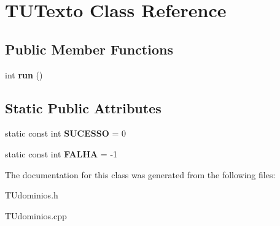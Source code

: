 \hypertarget{classTUTexto}{}\section{T\+U\+Texto Class Reference}
\label{classTUTexto}
\subsection*{Public Member Functions}
\begin{DoxyCompactItemize}
\item 
\mbox{\label{classTUTexto_afd0ced06861f0e336ef7248f36b31e2c}} 
int {\bfseries run} ()
\end{DoxyCompactItemize}
\subsection*{Static Public Attributes}
\begin{DoxyCompactItemize}
\item 
\mbox{\label{classTUTexto_a85843f1840647cc1c8dc2606fe03dc36}} 
static const int {\bfseries S\+U\+C\+E\+S\+SO} = 0
\item 
\mbox{\label{classTUTexto_ad225db82ebc02a313957712dbc70abd2}} 
static const int {\bfseries F\+A\+L\+HA} = -\/1
\end{DoxyCompactItemize}


The documentation for this class was generated from the following files\+:\begin{DoxyCompactItemize}
\item 
T\+Udominios.\+h\item 
T\+Udominios.\+cpp\end{DoxyCompactItemize}
